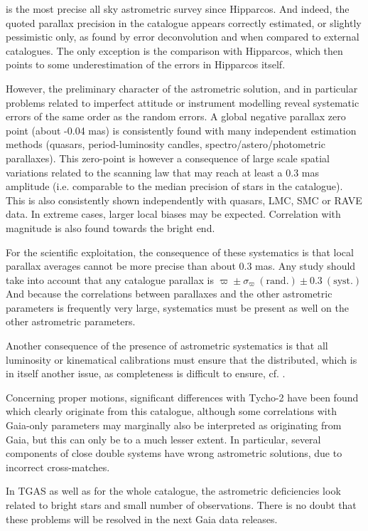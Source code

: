 {} is the most precise all sky astrometric survey since Hipparcos. 
And indeed, the quoted parallax precision in the catalogue appears correctly 
estimated, or slightly pessimistic only, as found by error deconvolution 
and when compared to external catalogues.
The only exception is the comparison with Hipparcos, which then points to some
underestimation of the errors in Hipparcos itself.

However, the preliminary character of the astrometric solution, and in particular
problems related to imperfect attitude or instrument modelling reveal systematic 
errors of the same order as the random errors.
A global negative parallax zero point (about -0.04 mas) is consistently 
found with many independent estimation methods (quasars, period-luminosity candles,
spectro/astero/photometric parallaxes).
This zero-point is however a consequence of large scale spatial variations
related to the scanning law that may reach at least a 0.3 mas amplitude 
(i.e. comparable to the median precision of stars in the catalogue). 
This is also consistently shown independently with quasars, LMC, SMC or RAVE data. 
In extreme cases, larger local biases may be expected.
Correlation with magnitude is also found towards the bright end.

For the scientific exploitation, the consequence of these systematics is that 
local parallax averages cannot be more precise than about 0.3 mas. 
Any study should take into account that any catalogue parallax is 
$\varpi \pm\sigma_\varpi \mathrm{~(rand.)} \pm 0.3 \mathrm{~(syst.)}$
And because the correlations between parallaxes and the other astrometric parameters 
is frequently very large, systematics must be present as well on the other 
astrometric parameters.

Another consequence of the presence of astrometric systematics is that all  
luminosity or kinematical calibrations must ensure that the 
 distributed, which is in itself another issue, as completeness is difficult 
to ensure, cf. . 

Concerning proper motions, significant differences with Tycho-2 have been found 
which clearly originate from this catalogue, although some correlations 
with Gaia-only parameters may marginally also be interpreted as originating from 
Gaia, but this can only be to a much lesser extent. In particular, several  
components of close double systems have wrong astrometric solutions, due to incorrect 
cross-matches.

In TGAS as well as for the whole catalogue, the astrometric deficiencies
look related to bright stars and small number of observations.
There is no doubt that these problems will be resolved in the next Gaia data 
releases. 



